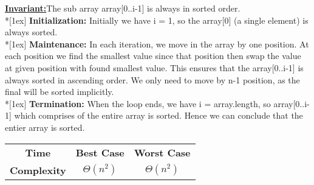 \documentclass{article}
\newcommand{\Invariant}{\textbf{\underline{Invariant:}}}
\newcommand{\topic}[1]{\textbf{#1:}}
\newcommand{\ls}{\\*[1ex]}
\newcommand{\timecase}[2]{ 
    \vspace{1em}
    \begin{center}
    \begin{tabular}{ |c|c|c| }
    \hline
    \textbf{Time} & \textbf{Best Case} & \textbf{Worst Case} \\ \cline{2-3}
    \textbf{Complexity} & $\Theta \left( #1 \right)$ & $\Theta \left( #2 \right)$ \\ \cline{2-3}
    \hline
    \end{tabular}
    \end{center}
}
\begin{document}
\Invariant The sub array array[0..i-1] is always in sorted order.
\ls
\topic{Initialization} Initially we have i = 1, so the array[0] (a single element) is always sorted.
\ls
\topic{Maintenance} In each iteration, we move in the array by one position. At each position we find the smallest value since that position then swap the value at given position with found smallest value. This ensures that the array[0..i-1] is always sorted in ascending order. We only need to move by n-1 position, as the final will be sorted implicitly.
\ls
\topic{Termination} When the loop ends, we have i = array.length, so array[0..i-1] which comprises of the entire array is sorted. Hence we can conclude that the entier array is sorted.

\timecase{n^2}{n^2}
\end{document}
